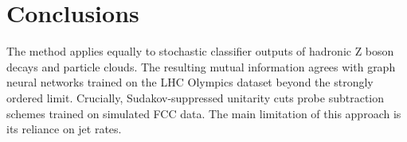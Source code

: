\section{Conclusions}\label{sec:conclusions}

The method applies equally to stochastic classifier outputs of hadronic
Z boson decays and particle clouds. The resulting mutual information
agrees with graph neural networks trained on the LHC Olympics dataset
beyond the strongly ordered limit. Crucially, Sudakov-suppressed
unitarity cuts probe subtraction schemes trained on simulated FCC data.
The main limitation of this approach is its reliance on jet rates.

